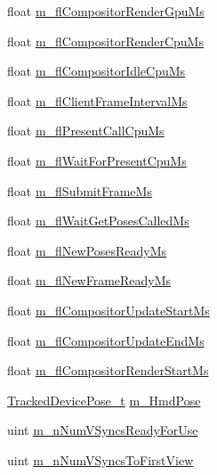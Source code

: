 \begin{DoxyCompactItemize}
float \mbox{\hyperlink{struct_valve_1_1_v_r_1_1_compositor___frame_timing_a8fac252a736250856778e5a19c1f0e18}{m\+\_\+fl\+Compositor\+Render\+Gpu\+Ms}}
\item 
float \mbox{\hyperlink{struct_valve_1_1_v_r_1_1_compositor___frame_timing_ab36a15ae4b635b1db7e62cd75267541b}{m\+\_\+fl\+Compositor\+Render\+Cpu\+Ms}}
\item 
float \mbox{\hyperlink{struct_valve_1_1_v_r_1_1_compositor___frame_timing_a883b5183b7f5c1ad5cb361a1a17c941a}{m\+\_\+fl\+Compositor\+Idle\+Cpu\+Ms}}
\item 
float \mbox{\hyperlink{struct_valve_1_1_v_r_1_1_compositor___frame_timing_a044d19d1b66ae71fd4d95bfcc9d01442}{m\+\_\+fl\+Client\+Frame\+Interval\+Ms}}
\item 
float \mbox{\hyperlink{struct_valve_1_1_v_r_1_1_compositor___frame_timing_a9eafcb07e7ec8a0b901a62e5d5fea53d}{m\+\_\+fl\+Present\+Call\+Cpu\+Ms}}
\item 
float \mbox{\hyperlink{struct_valve_1_1_v_r_1_1_compositor___frame_timing_aaed929cc2e40eabc1c9381739d3f3040}{m\+\_\+fl\+Wait\+For\+Present\+Cpu\+Ms}}
\item 
float \mbox{\hyperlink{struct_valve_1_1_v_r_1_1_compositor___frame_timing_a1beed1c4d0da8a0bceadd526634cd189}{m\+\_\+fl\+Submit\+Frame\+Ms}}
\item 
float \mbox{\hyperlink{struct_valve_1_1_v_r_1_1_compositor___frame_timing_a7712428e32c4cc274e8f0631131deef4}{m\+\_\+fl\+Wait\+Get\+Poses\+Called\+Ms}}
\item 
float \mbox{\hyperlink{struct_valve_1_1_v_r_1_1_compositor___frame_timing_a78d4ecb52ea11f6429f5d4f241cb70e6}{m\+\_\+fl\+New\+Poses\+Ready\+Ms}}
\item 
float \mbox{\hyperlink{struct_valve_1_1_v_r_1_1_compositor___frame_timing_abef38690811ca4462af770c7e8813b4a}{m\+\_\+fl\+New\+Frame\+Ready\+Ms}}
\item 
float \mbox{\hyperlink{struct_valve_1_1_v_r_1_1_compositor___frame_timing_af1a6b2f217ad390349f0237909e956e7}{m\+\_\+fl\+Compositor\+Update\+Start\+Ms}}
\item 
float \mbox{\hyperlink{struct_valve_1_1_v_r_1_1_compositor___frame_timing_a35aedece09fff425a0329f4660191a14}{m\+\_\+fl\+Compositor\+Update\+End\+Ms}}
\item 
float \mbox{\hyperlink{struct_valve_1_1_v_r_1_1_compositor___frame_timing_a9a0ec4b5a425886e13c1ead7ed08a4b0}{m\+\_\+fl\+Compositor\+Render\+Start\+Ms}}
\item 
\mbox{\hyperlink{struct_valve_1_1_v_r_1_1_tracked_device_pose__t}{Tracked\+Device\+Pose\+\_\+t}} \mbox{\hyperlink{struct_valve_1_1_v_r_1_1_compositor___frame_timing_adef0f8050197124b419245e237975545}{m\+\_\+\+Hmd\+Pose}}
\item 
uint \mbox{\hyperlink{struct_valve_1_1_v_r_1_1_compositor___frame_timing_a00e9a768426ed719d5c971b32a1045de}{m\+\_\+n\+Num\+V\+Syncs\+Ready\+For\+Use}}
\item 
uint \mbox{\hyperlink{struct_valve_1_1_v_r_1_1_compositor___frame_timing_ad1639d0b12365ca6a93aa6dac43c1d80}{m\+\_\+n\+Num\+V\+Syncs\+To\+First\+View}}
\end{DoxyCompactItemize}



